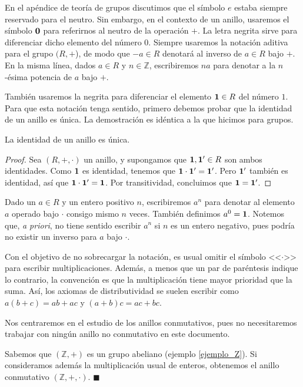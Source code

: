 En el apéndice de teoría de grupos discutimos que el símbolo $e$ estaba siempre reservado para el neutro. Sin embargo, en el contexto de un anillo, usaremos el símbolo $\mathbf{0}$ para referirnos al neutro de la operación $+$. La letra negrita sirve para diferenciar dicho elemento del número $0$. Siempre usaremos la notación aditiva para el grupo $(R, +$), de modo que $-a \in R$ denotará al inverso de $a \in R$ bajo $+$. En la misma línea, dados $a \in R$ y $n \in \mathbb{Z}$, escribiremos $na$ para denotar a la $n$-ésima potencia de $a$ bajo $+$.

También usaremos la negrita para diferenciar el elemento $\mathbf{1} \in R$ del número $1$. Para que esta notación tenga sentido, primero debemos probar que la identidad de un anillo es única. La demostración es idéntica a la que hicimos para grupos.

\begin{proposition}
    La identidad de un anillo es única.
\end{proposition}
    
    \begin{proof}
    Sea $(R, +, \cdot)$ un anillo, y supongamos que $\mathbf{1}, \mathbf{1}' \in R$ son ambos identidades. Como $\mathbf{1}$ es identidad, tenemos que $\mathbf{1} \cdot \mathbf{1}' = \mathbf{1}'$. Pero $\mathbf{1}'$ también es identidad, así que $\mathbf{1} \cdot \mathbf{1}' = \mathbf{1}$. Por transitividad, concluimos que $\mathbf{1} = \mathbf{1}'$.
    \end{proof}

Dado un $a \in R$ y un entero positivo $n$, escribiremos $a^n$ para denotar al elemento $a$ operado bajo $\cdot$ consigo mismo $n$ veces. También definimos $a^0 = \mathbf{1}$. Notemos que, \textit{a priori}, no tiene sentido escribir $a^n$ si $n$ es un entero negativo, pues podría no existir un inverso para $a$ bajo $\cdot$.

Con el objetivo de no sobrecargar la notación, es usual omitir el símbolo <<$\cdot$>> para escribir multiplicaciones. Además, a menos que un par de paréntesis indique lo contrario, la convención es que la multiplicación tiene mayor prioridad que la suma. Así, los axiomas de distributividad se suelen escribir como $a(b+c) = ab+ac$ y $(a+b)c = ac + bc$. 

Nos centraremos en el estudio de los anillos conmutativos, pues no necesitaremos trabajar con ningún anillo no conmutativo en este documento.

\begin{example} 
Sabemos que $(\mathbb{Z}, +)$ es un grupo abeliano (ejemplo \ref{ejemplo_Z}). Si consideramos además la multiplicación usual de enteros, obtenemos el anillo conmutativo $(\mathbb{Z}, +, \cdot)$. \hfill$\blacksquare$
\end{example}

